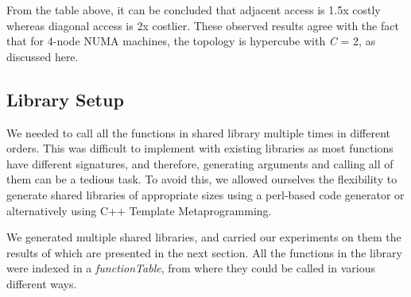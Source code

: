 From the table above, it can be concluded that adjacent access is 1.5x costly whereas diagonal access is
2x costlier. These observed results agree with the fact that for 4-node NUMA machines, the topology is
hypercube with \textit{C} = 2, as discussed here\cite{Drepper07whatevery}.

\subsection{Library Setup}
We needed to call all the functions in shared library multiple times in different orders. This was difficult
to implement with existing libraries as most functions have different signatures, and therefore, generating
arguments and calling all of them can be a tedious task. To avoid this, we allowed ourselves the flexibility
to generate shared libraries of appropriate sizes using a perl-based code generator or alternatively using
C++ Template Metaprogramming.\cite{templateMeta}

We generated multiple shared libraries, and carried our experiments on them the results of which are presented
in the next section. All the functions in the library were indexed in a \textit{functionTable}, from where they
could be called in various different ways.
